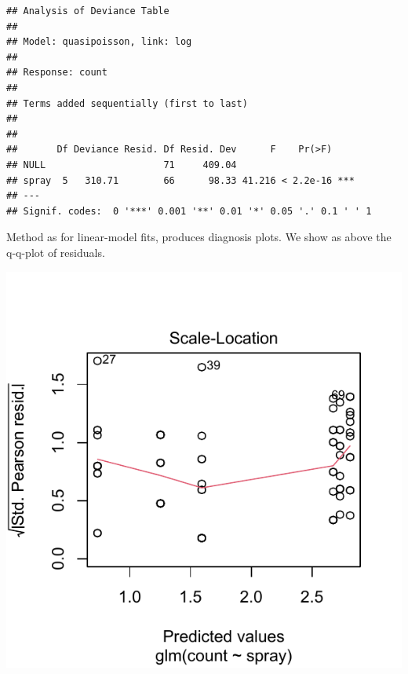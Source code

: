 \documentclass[krantz2]{krantz}\usepackage{knitr}
\begin{document}
\begin{knitrout}\footnotesize
{}\color{fgcolor}\begin{kframe}
\begin{alltt}
  \hlstd{=} \hlstd{)}
\end{alltt}
\begin{verbatim}
## Analysis of Deviance Table
##
## Model: quasipoisson, link: log
##
## Response: count
##
## Terms added sequentially (first to last)
##
##
##       Df Deviance Resid. Df Resid. Dev      F    Pr(>F)
## NULL                     71     409.04
## spray  5   310.71        66      98.33 41.216 < 2.2e-16 ***
## ---
## Signif. codes:  0 '***' 0.001 '**' 0.01 '*' 0.05 '.' 0.1 ' ' 1
\end{verbatim}
\end{kframe}
\end{knitrout}

Method  as for linear-model fits, produces diagnosis plots. We show as above the q-q-plot of residuals.

\begin{knitrout}\footnotesize
{}\color{fgcolor}\begin{kframe}
\begin{alltt}
  \hlstd{=} \hlstd{)}
\end{alltt}
\end{kframe}

{\centering \includegraphics[width=.54\textwidth]{figure/pos-model-11-1}

}



\end{knitrout}
\end{document}
